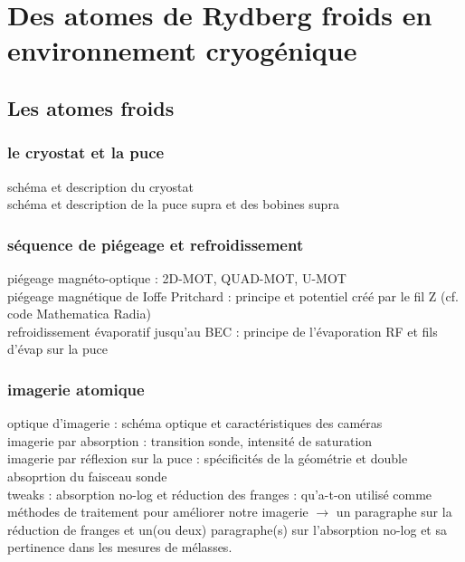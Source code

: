 \chapter{Des atomes de Rydberg froids en environnement cryogénique}
\label{chapter:setup_coldatoms_Rydberg}

\section{Les atomes froids}
	\subsection{le cryostat et la puce}
	\noindent schéma et description du cryostat \\
	\noindent schéma et description de la puce supra et des bobines supra
	\subsection{séquence de piégeage et refroidissement}
		\noindent piégeage magnéto-optique : 2D-MOT, QUAD-MOT, U-MOT \\
		
		\noindent piégeage magnétique de Ioffe Pritchard : principe et potentiel créé par le fil Z (cf. code Mathematica Radia)\\
		
		\noindent refroidissement évaporatif jusqu'au BEC : principe de l'évaporation RF et fils d'évap sur la puce
		
	\subsection{imagerie atomique}
		\noindent optique d'imagerie : schéma optique et caractéristiques des caméras \\
		
		\noindent imagerie par absorption : transition sonde, intensité de saturation \\
		\noindent imagerie par réflexion sur la puce : spécificités de la géométrie et double absoprtion du faisceau sonde \\
		
		\noindent tweaks : absorption no-log et réduction des franges : qu'a-t-on utilisé comme méthodes de traitement pour améliorer notre imagerie $\rightarrow$ un paragraphe sur la réduction de franges et un(ou deux) paragraphe(s) sur l'absorption no-log et sa pertinence dans les mesures de mélasses.
		
